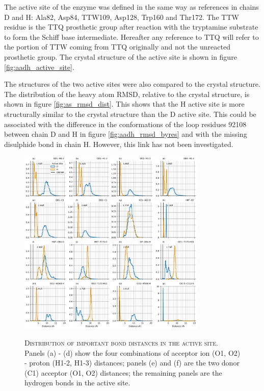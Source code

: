 The active site of the enzyme was defined in the same way as references  \cite{ranaghanInitioQMMM2017, masgrauAtomicDescriptionEnzyme2006, masgrauTunnelingClassicalPaths2007} in chains D and H: Ala82, Asp84, TTW109, Asp128, Trp160 and Thr172. The TTW residue is the TTQ prosthetic group after reaction with the tryptamine substrate to form the Schiff base intermediate. Hereafter any reference to TTQ will refer to the portion of TTW coming from TTQ originally and not the unreacted prosthetic group. The crystal structure of the active site is shown in figure \ref{fig:aadh_active_site}. 

The structures of the two active sites were also compared to the crystal structure. The distribution of the heavy atom RMSD, relative to the crystal structure, is shown in figure \ref{fig:as_rmsd_dist}. This shows that the H active site is more structurally similar to the crystal structure than the D active site. This could be associated with the difference in the conformations of the loop residues \num{92}{108} between chain D and H in figure \ref{fig:aadh_rmsd_byres} and with the missing disulphide bond in chain H. However, this link has not been investigated. 

\begin{figure}
    \centering
    \caption[Distribution of important bond distances in the active site]{\textsc{Distribution of important bond distances in the active site}. Panels (a) - (d) show the four combinations of acceptor ion (O1, O2) - proton (H1-2, H1-3) distances; panels (e) and (f) are the two donor (C1) acceptor (O1, O2) distances; the remaining panels are the hydrogen bonds in the active site.}
    \includegraphics[width=0.8\textwidth]{chapters/aadh/figures/bond_distances_dist.png}
    \label{fig:bond_dist}
\end{figure}

